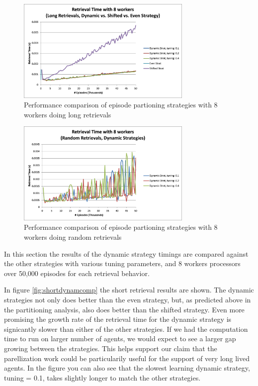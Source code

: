 \documentclass[11pt]{article} %
\begin{document}
\begin{figure}[h]
\caption{Performance comparison of episode partioning strategies with 8 workers doing long retrievals}\label{fig:longdynamcomp}
\centering
\includegraphics[width=0.75\textwidth]{images/alldynamiclong}
\end{figure}

\begin{figure}[h]
\caption{Performance comparison of episode partioning strategies with 8 workers doing random retrievals}\label{fig:randdynamcomp}
\centering
\includegraphics[width=0.75\textwidth]{images/alldynamicrand}
\end{figure}

In this section the results of the dynamic strategy timings are compared against the other strategies with various tuning parameters, and 8 workers processors over 50,000 episodes for each retrieval behavior.

In figure \ref{fig:shortdynamcomp} the short retrieval results are shown. The dynamic strategies not only does better than the even strategy, but, as predicted above in the partitioning analysis, also does better than the shifted strategy.  Even more promising the growth rate of the retrieval time for the dynamic strategy is signicantly slower than either of the other strategies.  If we had the computation time to run on larger number of agents, we would expect to see a larger gap growing between the strategies.  This helps support our claim that the parellization work could be particularily useful for the support of very long lived agents.  In the figure you can also see that the slowest learning dynamic strategy, tuning = 0.1, takes slightly longer to match the other strategies.
\end{document}
